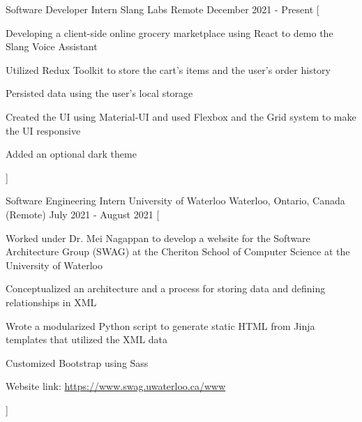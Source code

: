 

\begin{cventries}

  \cventry
    {Software Developer Intern} %
    {Slang Labs} %
    {Remote} %
    {December 2021 - Present} %
    [
      \begin{cvitems} %
        \item {Developing a client-side online grocery marketplace using React to demo the Slang Voice Assistant}
        \item {Utilized Redux Toolkit to store the cart's items and the user's order history}
        \item {Persisted data using the user's local storage}
        \item {Created the UI using Material-UI and used Flexbox and the Grid system to make the UI responsive}
        \item {Added an optional dark theme}
      \end{cvitems}
    ]

  \cventry
    {Software Engineering Intern} %
    {University of Waterloo} %
    {Waterloo, Ontario, Canada (Remote)} %
    {July 2021 - August 2021} %
    [
      \begin{cvitems} %
        \item {Worked under Dr. Mei Nagappan to develop a website for the Software Architecture Group (SWAG) at the Cheriton School of Computer Science at the University of Waterloo}
        \item {Conceptualized an architecture and a process for storing data and defining relationships in XML}
        \item {Wrote a modularized Python script to generate static HTML from Jinja templates that utilized the XML data}
        \item {Customized Bootstrap using Sass}
        \item {Website link: \href{https://www.swag.uwaterloo.ca/www}{https://www.swag.uwaterloo.ca/www}}
      \end{cvitems}
    ]


\end{cventries}
